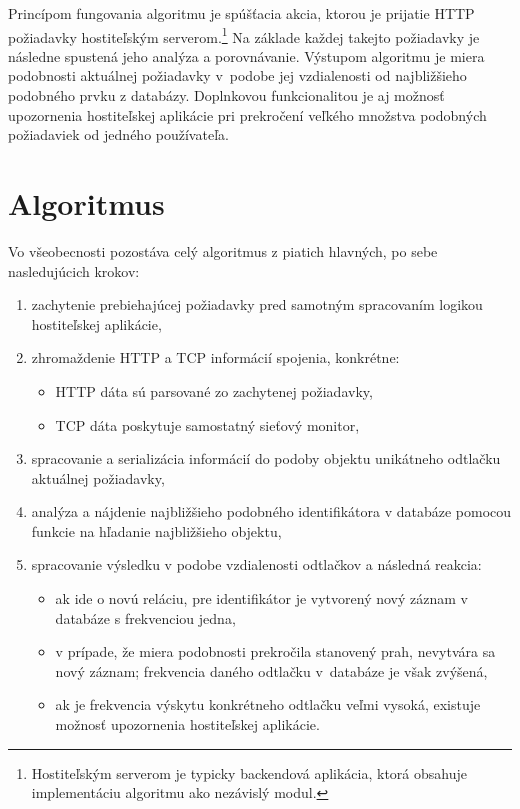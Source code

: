 \documentclass[
  digital, %
  oneside, %
  table,   %
  lof,     %
  nolot,   %
  nocover
]{fithesis3}
\begin{document}
Princípom fungovania algoritmu je spúšťacia akcia, ktorou je prijatie HTTP požiadavky
hostiteľským serverom.\footnote{Hostiteľským serverom je typicky backendová
aplikácia, ktorá obsahuje implementáciu algoritmu ako nezávislý modul.} Na
základe každej takejto požiadavky je následne spustená jeho analýza a
porovnávanie. Výstupom algoritmu je miera podobnosti aktuálnej
požiadavky v~podobe jej vzdialenosti od najbližšieho podobného prvku
z databázy. Doplnkovou funkcionalitou je aj možnosť upozornenia hostiteľskej
aplikácie pri prekročení veľkého množstva podobných požiadaviek od jedného používateľa.

\section{Algoritmus}
Vo všeobecnosti pozostáva celý algoritmus z piatich hlavných, po sebe nasledujúcich krokov:
\begin{enumerate}
  \item zachytenie prebiehajúcej požiadavky pred samotným spracovaním logikou hostiteľskej aplikácie,
  \item zhromaždenie HTTP a TCP informácií spojenia, konkrétne:
  \begin{itemize}
    \item HTTP dáta sú parsované zo zachytenej požiadavky,
    \item TCP dáta poskytuje samostatný sieťový monitor,
  \end{itemize}
  \item spracovanie a serializácia informácií do podoby objektu unikátneho odtlačku
  aktuálnej požiadavky,
  \item analýza a nájdenie najbližšieho podobného identifikátora v databáze pomocou funkcie na
  hľadanie najbližšieho objektu,
  \item spracovanie výsledku v podobe vzdialenosti odtlačkov a následná reakcia:
  \begin{itemize}
    \item ak ide o novú reláciu, pre identifikátor je vytvorený nový záznam v databáze s frekvenciou jedna,
    \item v prípade, že miera podobnosti prekročila stanovený prah, nevytvára
    sa nový záznam; frekvencia daného odtlačku v~databáze je však zvýšená,
    \item ak je frekvencia výskytu konkrétneho odtlačku veľmi vysoká, existuje
    možnosť upozornenia hostiteľskej aplikácie.
  \end{itemize}
\end{enumerate}
\end{document}
